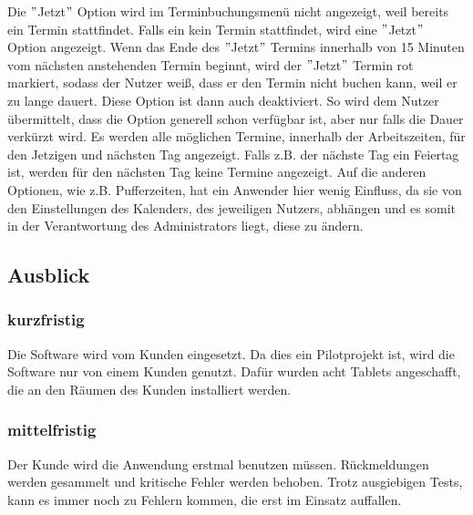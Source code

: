 Die \("\)Jetzt\("\) Option wird im Terminbuchungsmenü nicht angezeigt, weil bereits ein Termin stattfindet.
Falls ein kein Termin stattfindet, wird eine \("\)Jetzt\("\) Option angezeigt.
Wenn das Ende des \("\)Jetzt\("\) Termins innerhalb von 15 Minuten vom nächsten anstehenden Termin beginnt, wird der \("\)Jetzt\("\) Termin rot markiert, sodass der Nutzer weiß, dass er den Termin nicht buchen kann, weil er zu lange dauert.
Diese Option ist dann auch deaktiviert.
So wird dem Nutzer übermittelt, dass die Option generell schon verfügbar ist, aber nur falls die Dauer verkürzt wird.
Es werden alle möglichen Termine, innerhalb der Arbeitszeiten, für den Jetzigen und nächsten Tag angezeigt.
Falls z.B. der nächste Tag ein Feiertag ist, werden für den nächsten Tag keine Termine angezeigt.
Auf die anderen Optionen, wie z.B. Pufferzeiten, hat ein Anwender hier wenig Einfluss, da sie von den Einstellungen des Kalenders, des jeweiligen Nutzers, abhängen und es somit in der Verantwortung des Administrators liegt, diese zu ändern.
\newline
\newline

\subsection{Ausblick}\label{subsec:ausblick}
\subsubsection{kurzfristig}\label{subsubsec:kurzfristig}
Die Software wird vom Kunden eingesetzt.
Da dies ein Pilotprojekt ist, wird die Software nur von einem Kunden genutzt.
Dafür wurden acht Tablets angeschafft, die an den Räumen des Kunden installiert werden.

\subsubsection{mittelfristig}\label{subsubsec:mittelfristig}
Der Kunde wird die Anwendung erstmal benutzen müssen.
Rückmeldungen werden gesammelt und kritische Fehler werden behoben.
Trotz ausgiebigen Tests, kann es immer noch zu Fehlern kommen, die erst im Einsatz auffallen.
